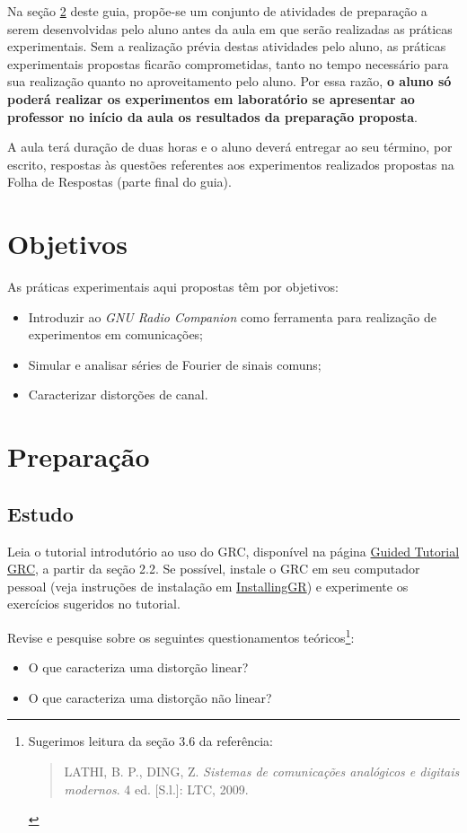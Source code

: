 \documentclass[12pt,addpoints]{exam}
\begin{document}
Na seção \ref{sect:Preparacao} deste guia, propõe-se um conjunto de atividades de preparação a serem desenvolvidas pelo aluno antes da aula em que serão realizadas as práticas experimentais. Sem a realização prévia destas atividades pelo aluno, as práticas experimentais propostas ficarão comprometidas, tanto no tempo necessário para sua realização quanto no aproveitamento pelo aluno. Por essa razão, \textbf{o aluno só poderá realizar os experimentos em laboratório se apresentar ao professor no início da aula os resultados da preparação proposta}. 

A aula terá duração de duas horas e o aluno deverá entregar ao seu término, por escrito, respostas às questões referentes aos experimentos realizados propostas na Folha de Respostas (parte final do guia).

\section{Objetivos}

As práticas experimentais aqui propostas têm por objetivos:
\begin{itemize}
    \item Introduzir ao \textit{GNU Radio Companion} como ferramenta para realização de experimentos em comunicações;
    \item Simular e analisar séries de Fourier de sinais comuns;
    \item Caracterizar distorções de canal.
\end{itemize}

\newpage

\section{Preparação} \label{sect:Preparacao}

\subsection{Estudo}

Leia o tutorial introdutório ao uso do GRC, disponível na página \href{http://wiki.gnuradio.org/index.php/Guided_Tutorial_GRC}{Guided Tutorial GRC}, a partir da seção 2.2. Se possível, instale o GRC em seu computador pessoal (veja instruções de instalação em \href{http://wiki.gnuradio.org/index.php/InstallingGR}{InstallingGR}) e experimente os exercícios sugeridos no tutorial.

Revise e pesquise sobre os seguintes questionamentos teóricos\footnote{Sugerimos leitura da seção 3.6 da referência: \begin{quote} LATHI, B. P., DING, Z. \textit{Sistemas de comunicações analógicos e digitais modernos}. 4 ed. [S.l.]: LTC, 2009. \end{quote}}:
\begin{itemize}
    \item O que caracteriza uma distorção linear? 
    \item O que caracteriza uma distorção não linear?
\end{itemize}
\end{document}
